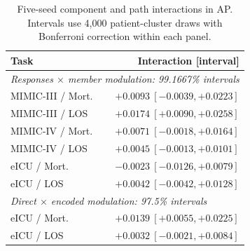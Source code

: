 \begin{table}[tp]
\centering\small
\setlength{\tabcolsep}{3pt}
\caption{Five-seed component and path interactions in AP. Intervals use 4,000 patient-cluster draws with Bonferroni correction within each panel.}
\label{tab:interaction}
\begin{tabular}{lr}
\toprule
Task & Interaction [interval] \\
\midrule
\multicolumn{2}{l}{\textit{Responses $\times$ member modulation: 99.1667\% intervals}} \\
MIMIC-III / Mort. & $+0.0093\ [-0.0039,+0.0223]$ \\
MIMIC-III / LOS & $+0.0174\ [+0.0090,+0.0258]$ \\
MIMIC-IV / Mort. & $+0.0071\ [-0.0018,+0.0164]$ \\
MIMIC-IV / LOS & $+0.0045\ [-0.0013,+0.0101]$ \\
eICU / Mort. & $-0.0023\ [-0.0126,+0.0079]$ \\
eICU / LOS & $+0.0042\ [-0.0042,+0.0128]$ \\
\multicolumn{2}{l}{\textit{Direct $\times$ encoded modulation: 97.5\% intervals}} \\
eICU / Mort. & $+0.0139\ [+0.0055,+0.0225]$ \\
eICU / LOS & $+0.0032\ [-0.0021,+0.0084]$ \\
\bottomrule
\end{tabular}
\end{table}
